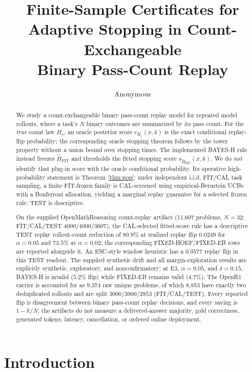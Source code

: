 \documentclass{article}
\title{Finite-Sample Certificates for\\
Adaptive Stopping in Count-Exchangeable\\
Binary Pass-Count Replay}
\author{Anonymous}
\date{}
\theoremstyle{definition}
\theoremstyle{remark}
\newcommand{\trueH}{H_\star}
\newcommand{\oraclecert}{c_{\trueH}}
\newcommand{\fitscore}{s_{\widehat H_{\mathrm{FIT}}}}
\begin{document}
\maketitle

\begin{abstract}
We study a count-exchangeable binary pass-count replay model for repeated model
rollouts, where a task's $N$ binary outcomes are summarized by its pass count.
For the \emph{true} count law $\trueH$, an oracle posterior score
$\oraclecert(x,k)$ is the exact conditional replay-flip probability; the
corresponding oracle stopping theorem follows by the tower property without a
union bound over stopping times. The implemented BAYES-H rule instead freezes
$\widehat H_{\mathrm{FIT}}$ and thresholds the fitted stopping score
$\fitscore(x,k)$. We do \emph{not} identify that plug-in score with the oracle
conditional probability. Its operative high-probability statement is
Theorem~\ref{thm:pop}: under independent i.i.d. FIT/CAL task sampling, a finite
FIT-frozen family is CAL-screened using empirical-Bernstein UCBs with a
Bonferroni allocation, yielding a marginal replay guarantee for a selected
frozen rule; TEST is descriptive.

On the supplied OpenMathReasoning count-replay artifact (11{,}607 problems,
$N=32$; FIT/CAL/TEST $4000/4000/3607$), the CAL-selected fitted-score rule has
a descriptive TEST replay rollout-count reduction of $80.9\%$ at realized
replay flip $0.0249$ for $\alpha=0.05$ and $73.5\%$ at $\alpha=0.02$; the
corresponding FIXED-HOEF/FIXED-EB rows are reported alongside it. An ESC-style
window heuristic has a $0.0577$ replay flip in this TEST readout. The supplied
synthetic drift and all margin-exploration results are explicitly synthetic,
exploratory, and nonconfirmatory: at E3, $\alpha=0.05$, and $\delta=0.15$,
BAYES-H is invalid ($5.2\%$ flip) while FIXED-EB remains valid ($4.7\%$).
The OpenR1 carrier is accounted for as 9{,}374 raw unique problems, of which
8{,}853 have exactly two deduplicated rollouts and are split
$3000/3000/2853$ (FIT/CAL/TEST). Every reported flip is disagreement between
binary pass-count replay decisions, and every saving is $1-\bar k/N$; the
artifacts do not measure a delivered-answer majority, gold correctness,
generated tokens, latency, cancellation, or ordered online deployment.
\end{abstract}

\section{Introduction}
\label{sec:intro}
\end{document}
